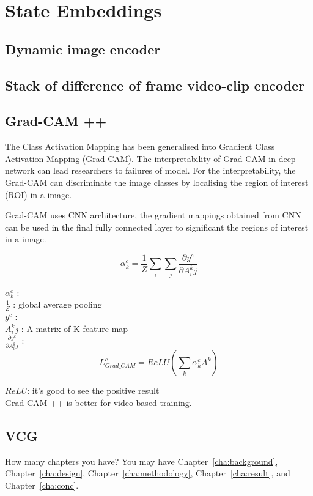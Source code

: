 \chapter{State Embeddings}


\section{Dynamic image encoder}


\section{Stack of difference of frame video-clip encoder}

\section{Grad-CAM ++}
The Class Activation Mapping has been generalised into Gradient Class Activation Mapping (Grad-CAM). The interpretability of Grad-CAM in deep network can lead researchers to failures of model. For the interpretability, the Grad-CAM can discriminate the image classes by localising the region of interest (ROI) in a image. 

Grad-CAM uses CNN architecture, the gradient mappings obtained from CNN can be used in the final fully connected layer to significant the regions of interest in a image. 
 
\[\alpha ^c_k = \frac{1}{Z}\sum_i \sum_j \frac{\partial y^c}{\partial A^k_ij}\]

 $\alpha ^c_k$ : \\
 
 $\frac{1}{Z}$ : global average pooling\\
 
 $y^c$ :\\
 
 $A^k_ij$ : A matrix of K feature map\\
 
 $\frac{\partial y^c}{\partial A^k_ij}$ :\\


\[L^c_{Grad\_CAM} = ReLU(\sum _k \alpha^c_kA^k)\]

$ReLU$:
it's good to see the positive result \\

Grad-CAM ++ is better for video-based training.


\section{VCG}


How many chapters you have? You may have Chapter~\ref{cha:background},
Chapter~\ref{cha:design}, Chapter~\ref{cha:methodology},
Chapter~\ref{cha:result}, and Chapter~\ref{cha:conc}.
